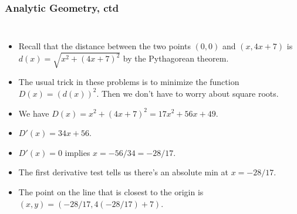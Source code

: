 \documentclass[serif,ignorenonframetext]{beamer}
\begin{document}
\begin{frame}
  \frametitle{Analytic Geometry, ctd}
  \begin{columns}
  \begin{itemize}[<+->]
  \item Recall that the distance between the two points $(0,0)$ and
    $(x,4x+7)$ is $d(x)=\sqrt{x^2+(4x+7)^2}$ by the Pythagorean theorem.
  \item The usual trick in these problems is to minimize the function 
    $D(x)=(d(x))^2$.  Then we don't have to worry about square roots.
  \item We have $D(x)=x^2+(4x+7)^2=17x^2+56x+49$.
  \item $D'(x)=34x+56$.
  \item $D'(x)=0$ implies $x=-56/34=-28/17$.
  \item The first derivative test tells us there's an absolute min
    at $x=-28/17$.
  \item The point on the line that is closest
    to the origin is $(x,y)=(-28/17,4(-28/17)+7)$.
  \end{itemize}

\end{columns}
\end{frame}
\end{document}
